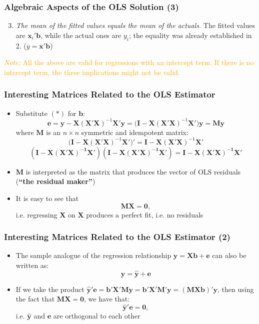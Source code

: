 \documentclass[10pt]{beamer}
\theoremstyle{definition}
\begin{document}
\begin{frame}[fragile]
\frametitle{Algebraic Aspects of the OLS Solution (3)}
\begin{enumerate}
  \setcounter{enumi}{2}
  \item \textit{The mean of the fitted values equals the mean of the actuals.} The fitted values are $\mathbf{x}_{i}'\mathbf{b}$, while the actual ones are $y_{i}$; the equality was already established in 2. ($\overline{y} = \overline{\mathbf{x}}'\mathbf{b}$) 
\end{enumerate}

\vspace{0.5cm}

\textcolor{orange}{\textit{Note:} All the above are valid for regressions with an intercept term. If there is no intercept term, the three implications might not be valid.}
\end{frame}

\begin{frame}[fragile]
\frametitle{Interesting Matrices Related to the OLS Estimator}
\begin{itemize}
	\item Substitute $(*)$ for $\mathbf{b}$:
	\[
		\mathbf{e} = \mathbf{y - X(X'X)}^{-1}\mathbf{X'y = (I-X(X'X)}^{-1}\mathbf{X')y = My} 
	\]
	where $\mathbf{M}$ is an $n\times n$ symmetric and idempotent matrix:
	\[
		\mathbf{(I-X(X'X)}^{-1}\mathbf{X')'} = \mathbf{I-X(X'X)}^{-1}\mathbf{X'}
	\]
	\[
		\mathbf{(I-X(X'X)^{-1}X')(I-X(X'X)^{-1}X') = I-X(X'X)^{-1}X'}
	\]
	\item $\mathbf{M}$ is interpreted as the matrix that produces the vector of OLS residuals (\textbf{``the residual maker''})
	\item It is easy to see that
	\[
		\mathbf{MX = 0},
	\]
	i.e. regressing $\mathbf{X}$ on $\mathbf{X}$ produces a perfect fit, i.e. no residuals
\end{itemize}
\end{frame}

\begin{frame}[fragile]
\frametitle{Interesting Matrices Related to the OLS Estimator (2)}
\begin{itemize}
	\item The sample analogue of the regression relationship $\mathbf{y = Xb + e}$ can also be written as:
	\[
		\mathbf{y = \widehat{y} + e}
	\]	
	\item If we take the product $\mathbf{\widehat{y}'e = b'X'My = b'X'M'y = (MXb)'y}$, then using the fact that $\mathbf{MX = 0}$, we have that:
	\[
		\mathbf{\widehat{y}'e = 0},
	\]
	i.e. $\mathbf{\hat{y}}$ and $\mathbf{e}$ are orthogonal to each other
\end{itemize}
\end{frame}
\end{document}
